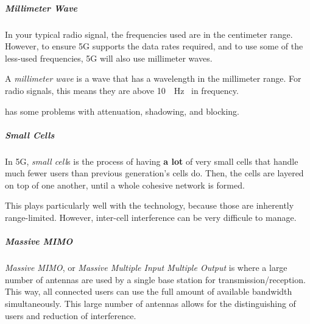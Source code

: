 \subparagraph{Millimeter Wave}\label{subpar:Millimeter_Wave}
In your typical radio signal, the frequencies used are in the centimeter range.
However, to ensure 5G supports the data rates required, and to use some of the less-used frequencies, 5G will also use millimeter waves.

\begin{definition}\label{def:Millimeter_Wave}
  A \emph{millimeter wave} is a wave that has a wavelength in the millimeter range.
  For radio signals, this means they are above \SI{10}{\giga{} \hertz{}} in frequency.

  \begin{remark}[Problems]\label{rmk:Millimeter_Wave_Problems}
     has some problems with attenuation, shadowing, and blocking.
  \end{remark}
\end{definition}

\subparagraph{Small Cells}\label{subpar:Small_Cells}
\begin{definition}\label{def:Small_Cell}
  In 5G, \emph{small cell}s is the process of having \textbf{a lot} of very small cells that handle much fewer users than previous generation's cells do.
  Then, the cells are layered on top of one another, until a whole cohesive network is formed.
\end{definition}

This plays particularly well with the  technology, because those are inherently range-limited.
However, inter-cell interference can be very difficule to manage.

\subparagraph{Massive MIMO}\label{subpar:Massive_MIMO}
\begin{definition}\label{def:Massive_MIMO}
  \emph{Massive MIMO}, or \emph{Massive Multiple Input Multiple Output} is where a large number of antennas are used by a single base station for transmission/reception.
  This way, all connected users can use the full amount of available bandwidth simultaneously.
  This large number of antennas allows for the distinguishing of users and reduction of interference.
\end{definition}

